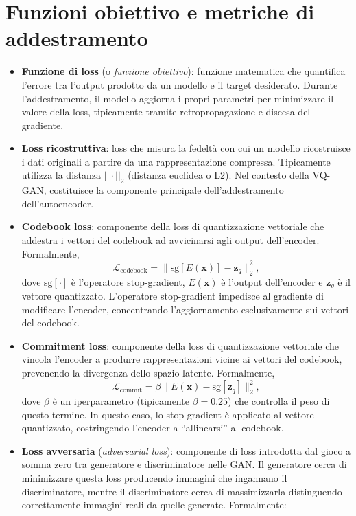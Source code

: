 \section{Funzioni obiettivo e metriche di addestramento}
\label{sec:def-loss}
\begin{itemize}
	\item \textbf{Funzione di loss} (o \emph{funzione obiettivo}): funzione matematica che quantifica l'errore tra l'output prodotto da un modello e il target desiderato. Durante l'addestramento, il modello aggiorna i propri parametri per minimizzare il valore della loss, tipicamente tramite retropropagazione e discesa del gradiente.
	\item \textbf{Loss ricostruttiva}: loss che misura la fedeltà con cui un modello ricostruisce i dati originali a partire da una rappresentazione compressa. Tipicamente utilizza la distanza $||\cdot||_2$ (distanza euclidea o L2). Nel contesto della VQ-GAN, costituisce la componente principale dell'addestramento dell'autoencoder.
	\item \textbf{Codebook loss}: componente della loss di quantizzazione vettoriale che addestra i vettori del codebook ad avvicinarsi agli output dell'encoder. Formalmente, 
	$$
		\mathcal{L}_{\text{codebook}} = \|\mathrm{sg}[E(\mathbf{x})] - \mathbf{z}_q\|_2^2,
	$$
	dove $\mathrm{sg}[\cdot]$ è l'operatore stop-gradient, $E(\mathbf{x})$ è l'output dell'encoder e $\mathbf{z}_q$ è il vettore quantizzato. L'operatore stop-gradient impedisce al gradiente di modificare l'encoder, concentrando l'aggiornamento esclusivamente sui vettori del codebook.
	\item \textbf{Commitment loss}: componente della loss di quantizzazione vettoriale che vincola l'encoder a produrre rappresentazioni vicine ai vettori del codebook, prevenendo la divergenza dello spazio latente. Formalmente, 
	$$
		\mathcal{L}_{\text{commit}} = \beta \|E(\mathbf{x}) - \mathrm{sg}[\mathbf{z}_q]\|_2^2,
	$$
	dove $\beta$ è un iperparametro (tipicamente $\beta=0.25$) che controlla il peso di questo termine. In questo caso, lo stop-gradient è applicato al vettore quantizzato, costringendo l'encoder a ``allinearsi'' al codebook.
	\item \textbf{Loss avversaria} (\emph{adversarial loss}): componente di loss introdotta dal gioco a somma zero tra generatore e discriminatore nelle GAN. Il generatore cerca di minimizzare questa loss producendo immagini che ingannano il discriminatore, mentre il discriminatore cerca di massimizzarla distinguendo correttamente immagini reali da quelle generate. Formalmente: 

\end{itemize}
